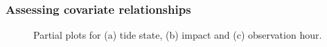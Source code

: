 \documentclass[11pt, a4paper]{article}
\begin{document}
\begin{frame}[fragile]
\frametitle{Assessing covariate relationships}
\begin{figure}[h]
  \centering
  \hfill
  \caption{Partial plots for (a) tide state, (b) impact and (c) observation hour.}
  \label{fig:partials}
\end{figure}
\end{frame}
\end{document}
